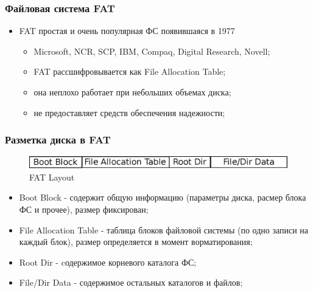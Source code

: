 \begin{frame}
\frametitle{Файловая система FAT}
\begin{itemize}
  \item FAT простая и очень популярная ФС появившаяся в 1977
    \begin{itemize}
      \item Microsoft, NCR, SCP, IBM, Compaq, Digital Research, Novell;
      \item FAT рассшифровывается как File Allocation Table;
      \item она неплохо работает при небольших объемах диска;
      \item не предоставляет средств обеспечения надежности;
    \end{itemize}
\end{itemize}
\end{frame}

\begin{frame}
\frametitle{Разметка диска в FAT}
\begin{figure}
  \centering\includegraphics[width=.8\linewidth]{fat-layout}
  \caption{FAT Layout}
\end{figure}
\begin{itemize}
  \item Boot Block - содержит общую информацию (параметры диска, расмер блока ФС и прочее), размер фиксирован;
  \item File Allocation Table - таблица блоков файловой системы (по одно записи на каждый блок), размер определяется в момент ворматирования;
  \item Root Dir - cодержимое корневого каталога ФС;
  \item File/Dir Data - содержимое остальных каталогов и файлов;
\end{itemize}
\end{frame}

